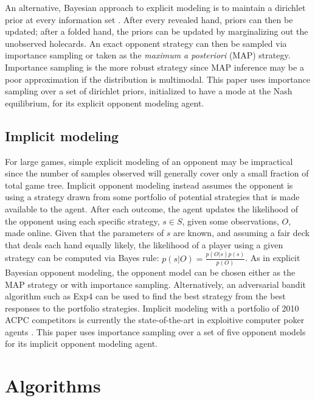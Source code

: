 \documentclass{aamas2013}
\begin{document}
    An alternative, Bayesian approach to explicit modeling is to maintain a dirichlet prior at every information set \cite{bayesbluff,shortterm}. After every revealed hand, priors can then be updated; after a folded hand, the priors can be updated by marginalizing out the unobserved holecards. An exact opponent strategy can then be sampled via importance sampling or taken as the \textit{maximum a posteriori} (MAP) strategy. Importance sampling is the more robust strategy since MAP inference may be a poor approximation if the distribution is multimodal. This paper uses importance sampling over a set of dirichlet priors, initialized to have a mode at the Nash equilibrium, for its explicit opponent modeling agent.
    
    \subsection{Implicit modeling}
    For large games, simple explicit modeling of an opponent may be impractical since the number of samples observed will generally cover only a small fraction of total game tree. Implicit opponent modeling \cite{shortterm} instead assumes the opponent is using a strategy drawn from some portfolio of potential strategies that is made available to the agent. After each outcome, the agent updates the likelihood of the opponent using each specific strategy, $s \in S$, given some observations, $O$, made online. Given that the parameters of $s$ are known, and assuming a fair deck that deals each hand equally likely, the likelihood of a player using a given strategy can be computed via Bayes rule: $p(s | O) = \frac{p(O | s)p(s)}{p(O)}$. As in explicit Bayesian opponent modeling, the opponent model can be chosen either as the MAP strategy or with importance sampling. Alternatively, an adversarial bandit algorithm such as Exp4 \cite{exp4} can be used to find the best strategy from the best responses to the portfolio strategies. Implicit modeling with a portfolio of 2010 ACPC competitors is currently the state-of-the-art in exploitive computer poker agents \cite{implicit}. This paper uses importance sampling over a set of five opponent models for its implicit opponent modeling agent.

\section{Algorithms}
\end{document}
